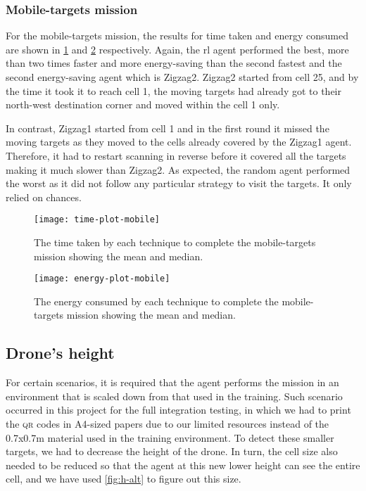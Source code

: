 \documentclass[../main.tex]{subfiles}
\begin{document}
\subsubsection{Mobile-targets mission}

For the mobile-targets mission, the results for time taken and energy consumed are shown in 
\cref{fig:time-plot-mobile} and \cref{fig:energy-plot-mobile} respectively.
Again, the \gls{rl} agent performed the best, more than two times
faster and more energy-saving than the
second fastest and the second energy-saving agent which is Zigzag2.
Zigzag2 started from cell 25, and by the time it took it to reach
cell 1, the moving targets had already got to their north-west
destination corner and moved within the cell 1 only.

In contrast, Zigzag1 started from cell 1 and in the first round it
missed the moving targets as they moved to the cells already covered
by the Zigzag1 agent.
Therefore, it had to restart scanning in reverse before it
covered all the targets making it much slower than Zigzag2.
As expected, the random agent performed the worst as it did not follow
any particular strategy to visit the targets. It only relied on
chances.

\begin{figure}[tbp]
	\centering
	\texttt{[image: time-plot-mobile]}
	\caption{The time taken by each technique
        to complete the mobile-targets mission showing the mean and
    median.}
        \label{fig:time-plot-mobile}
\end{figure}

\begin{figure}[tbp]
	\centering
	\texttt{[image: energy-plot-mobile]}
	\caption{The energy consumed by each technique
        to complete the mobile-targets mission showing the mean and
    median.}
        \label{fig:energy-plot-mobile}
\end{figure}

\subsection{Drone's height}

For certain scenarios, it is required that the agent performs the
mission in an environment that is scaled down from that used in the
training.
Such scenario occurred in this project for the full integration
testing, in which we had to print the \textsc{qr} codes in A4-sized papers due
to our limited resources instead of the 0.7x0.7m material used in the
training environment.
To detect these smaller targets, we had to decrease the height of the
drone.
In turn, the cell size also needed to be reduced so that the agent at
this new lower height can see the entire cell, and we have used
\cref{fig:h-alt} to figure out this size.
\end{document}
